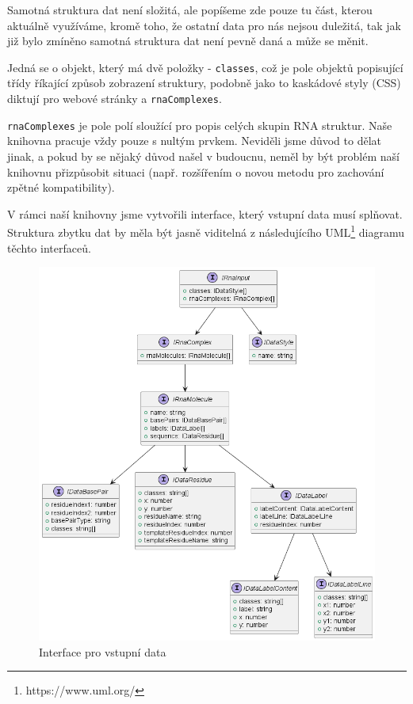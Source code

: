 Samotná struktura dat není složitá, ale popíšeme zde pouze tu část, kterou
aktuálně využíváme, kromě toho, že ostatní data pro nás nejsou duležitá, tak
jak již bylo zmíněno samotná struktura dat není pevně daná a může se měnit.

Jedná se o objekt, který má dvě položky - \texttt{classes}, což je pole objektů
popisující třídy říkající způsob zobrazení struktury, podobně jako to kaskádové
styly (CSS) diktují pro webové stránky a \texttt{rnaComplexes}. 

\texttt{rnaComplexes} je pole polí sloužící pro popis celých skupin RNA
struktur. Naše knihovna pracuje vždy pouze s nultým prvkem. Neviděli jsme důvod
to dělat jinak, a pokud by se nějaký důvod našel v budoucnu, neměl by být
problém naší knihovnu přizpůsobit situaci (např. rozšířením o novou metodu pro
zachování zpětné kompatibility).

V rámci naší knihovny jsme vytvořili interface, který vstupní data musí
splňovat. Struktura zbytku dat by měla být jasně viditelná z následujícího
UML\footnote{https://www.uml.org/} diagramu těchto interfaceů.

\begin{figure}[H]
  \centering
  \includegraphics[width=145mm]{../img/rnaInput.png}
  \caption{Interface pro vstupní data}
\end{figure}

